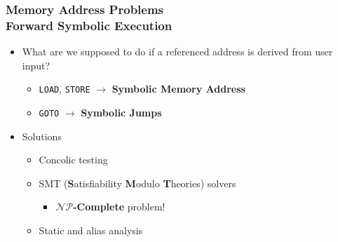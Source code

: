 \begin{frame}[noframenumbering]
	\frametitle{Memory Address Problems\\Forward Symbolic Execution}
	\begin{itemize}
		\item What are we supposed to do if a referenced address is derived from user input?
		\begin{itemize}
			\item \texttt{LOAD}, \texttt{STORE} $\rightarrow$ \textbf{Symbolic Memory Address}
			\item \texttt{GOTO} $\rightarrow$ \textbf{Symbolic Jumps}
		\end{itemize}
		\item Solutions
		\begin{itemize}
			\item Concolic testing
			\item SMT (\textbf{S}atisfiability \textbf{M}odulo \textbf{T}heories) solvers
			\begin{itemize}
				\item $\mathcal{NP}$\textbf{-Complete} problem!
			\end{itemize}
			\item Static and alias analysis
		\end{itemize}
	\end{itemize}
\end{frame}